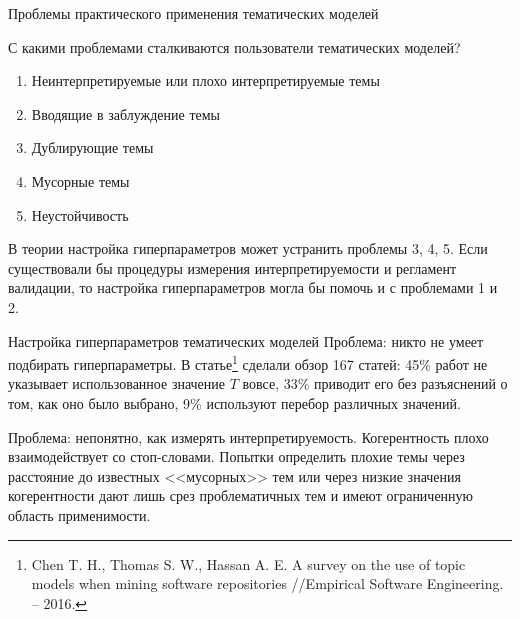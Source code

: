 \begin{frame}[t]{Проблемы практического применения тематических моделей}

С какими проблемами сталкиваются пользователи тематических моделей?
\begin{enumerate}
    \item Неинтерпретируемые или плохо интерпретируемые темы
    \item Вводящие в заблуждение темы
    \item Дублирующие темы
    \item Мусорные темы
    \item Неустойчивость
\end{enumerate}
В теории настройка гиперпараметров может устранить проблемы 3, 4, 5. Если существовали бы процедуры измерения интерпретируемости и регламент валидации, то настройка гиперпараметров могла бы помочь и с проблемами 1 и 2.
\end{frame}

\begin{frame}{Настройка гиперпараметров тематических моделей}
Проблема: никто не умеет подбирать гиперпараметры. В статье\footnote{Chen T. H., Thomas S. W., Hassan A. E. A survey on the use of topic models when mining software repositories //Empirical Software Engineering. – 2016.} сделали обзор 167 статей: 45\% работ не указывает использованное значение $T$ вовсе, 33\% приводит его без разъяснений о том, как оно было выбрано, 9\% используют перебор различных значений.

\bigskip

Проблема: непонятно, как измерять интерпретируемость. Когерентность плохо взаимодействует со стоп-словами. Попытки определить плохие темы через расстояние до известных <<мусорных>> тем или через низкие значения когерентности дают лишь срез проблематичных тем и имеют ограниченную область применимости.

\end{frame}

